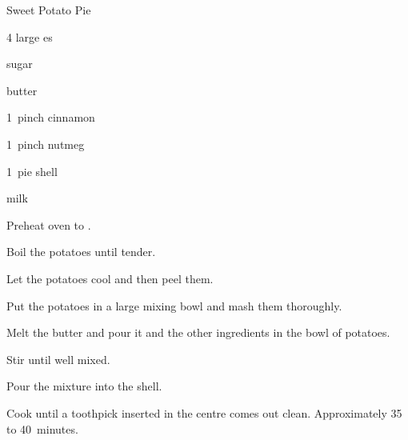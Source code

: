 \begin{recipe}{Sweet Potato Pie}{}{}

\begin{ingredients}
\item 4 large es
\item {} sugar
\item \C{\half} butter
\item 1~pinch cinnamon
\item 1~pinch nutmeg
\item 1~pie shell
\item \C{\half} milk
\end{ingredients}

\begin{directions}
\item Preheat oven to .
\item Boil the potatoes until tender.
\item Let the potatoes cool and then peel them.
\item Put the potatoes in a large mixing bowl and mash them thoroughly.
\item Melt the butter and pour it and the other ingredients in the bowl of potatoes.
\item Stir until well mixed.
\item Pour the mixture into the shell.
\item Cook until a toothpick inserted in the centre comes out clean. Approximately 35 to 40~minutes.
\end{directions}

\end{recipe}
